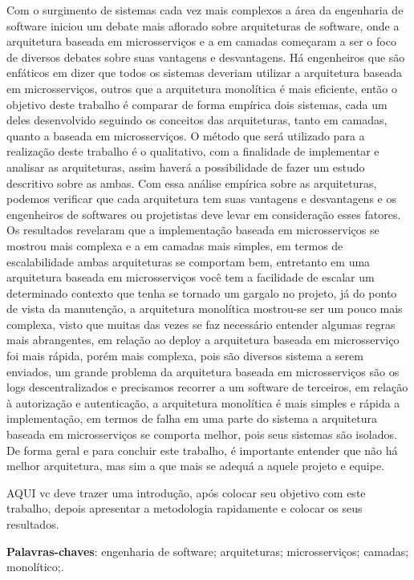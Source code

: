 \documentclass[12pt,oneside,a4paper,english,french,spanish,brazil]{abntex2}
\begin{document}
\begin{resumo}
Com o surgimento de sistemas cada vez mais complexos a área da engenharia de software iniciou um debate mais aflorado sobre arquiteturas de software, onde  a arquitetura baseada em microsserviços e a em camadas começaram a ser o foco de diversos debates sobre suas vantagens e desvantagens. Há engenheiros que são enfáticos em dizer que todos os sistemas deveriam utilizar a arquitetura baseada em microsserviços, outros que a arquitetura monolítica é mais eficiente, então o objetivo deste trabalho é comparar de forma empírica dois sistemas, cada um deles desenvolvido seguindo os conceitos das arquiteturas, tanto em camadas, quanto a baseada em microsserviços. O método que será utilizado para a realização deste trabalho é o qualitativo, com a finalidade de implementar e analisar as arquiteturas, assim haverá a possibilidade de fazer um estudo descritivo sobre as ambas. Com essa análise empírica sobre as arquiteturas, podemos verificar que cada arquitetura tem suas vantagens e desvantagens e os engenheiros de softwares ou projetistas deve levar em consideração esses fatores. Os resultados revelaram que a implementação baseada em microsserviços se mostrou mais complexa e a em camadas mais simples, em  termos de escalabilidade ambas arquiteturas se comportam bem, entretanto em uma arquitetura baseada em microsserviços você tem a facilidade de escalar um determinado contexto que tenha se tornado um gargalo no projeto, já do ponto de vista da manutenção, a arquitetura monolítica mostrou-se ser um pouco mais complexa, visto que muitas das vezes se faz necessário entender algumas regras mais abrangentes, em relação ao deploy a arquitetura baseada em microsserviço foi mais rápida, porém mais complexa, pois são diversos sistema a serem enviados, um grande problema da arquitetura baseada em microsserviços são os logs descentralizados e precisamos recorrer a um software de terceiros,  em relação à autorização e autenticação, a arquitetura monolítica é mais simples e rápida a implementação, em termos de falha em uma parte do sistema a arquitetura baseada em microsserviços se comporta melhor, pois seus sistemas são isolados. De forma geral e para concluir este trabalho, é importante entender que não há melhor arquitetura, mas sim a que mais se adequá a aquele projeto e equipe.

AQUI vc deve trazer uma introdução, após colocar seu objetivo com este trabalho, depois apresentar a metodologia rapidamente e colocar os seus resultados.
 \vspace{\onelineskip}

 \noindent
 \textbf{Palavras-chaves}: engenharia de software; arquiteturas; microsserviços; camadas; monolítico;.
\end{resumo}
\end{document}
